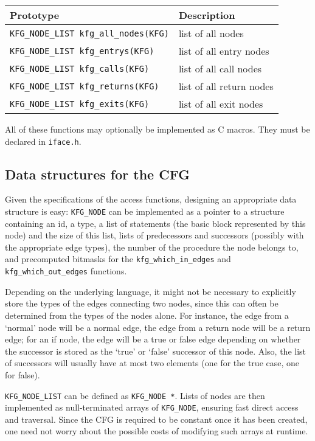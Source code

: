 \begin{longtable}{|p{} | p{}|}
\hline
Prototype & Description \\
\hline
\hline \endhead
\verb|KFG_NODE_LIST kfg_all_nodes(KFG)|
    & list of all nodes \\
\hline
\verb|KFG_NODE_LIST kfg_entrys(KFG)|
    & list of all entry nodes \\
\hline
\verb|KFG_NODE_LIST kfg_calls(KFG)|
    & list of all call nodes \\
\hline
\verb|KFG_NODE_LIST kfg_returns(KFG)|
    & list of all return nodes \\
\hline
\verb|KFG_NODE_LIST kfg_exits(KFG)|
    & list of all exit nodes \\
\hline
\end{longtable}

All of these functions may optionally be implemented as C macros.
They must be declared in \verb|iface.h|.

\subsection{Data structures for the CFG}

Given the specifications of the access functions, designing an
appropriate data structure is easy: \verb|KFG_NODE| can be
implemented as a pointer to a structure containing an id, a type, a
list of statements (the basic block represented by this node) and
the size of this list, lists of predecessors and successors
(possibly with the appropriate edge types), the number of the
procedure the node belongs to, and precomputed bitmasks for the
\verb|kfg_which_in_edges| and \verb|kfg_which_out_edges| functions.

Depending on the underlying language, it might not be necessary to
explicitly store the types of the edges connecting two nodes, since
this can often be determined from the types of the nodes alone. For
instance, the edge from a `normal' node will be a normal edge, the
edge from a return node will be a return edge; for an if node, the
edge will be a true or false edge depending on whether the successor
is stored as the `true' or `false' successor of this node. Also, the
list of successors will usually have at most two elements (one for
the true case, one for false).

\verb|KFG_NODE_LIST| can be defined as \verb|KFG_NODE *|. Lists of
nodes are then implemented as null-terminated arrays of
\verb|KFG_NODE|, ensuring fast direct access and traversal. Since
the CFG is required to be constant once it has been created, one
need not worry about the possible costs of modifying such arrays at
runtime.

